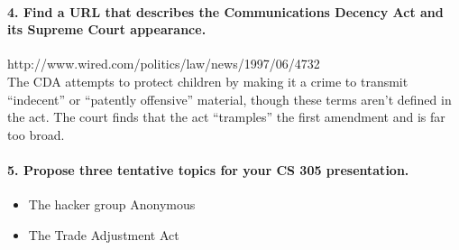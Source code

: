 \documentclass{article}
\begin{document}
\paragraph{4. Find a URL that describes the Communications Decency Act and its Supreme Court appearance.\\}
http://www.wired.com/politics/law/news/1997/06/4732\\
The CDA attempts to protect children by making it a crime to transmit ``indecent'' or ``patently offensive'' material, though these terms aren't defined in the act.
The court finds that the act ``tramples'' the first amendment and is far too broad.

\paragraph{5. Propose three tentative topics for your CS 305 presentation.\\}
\begin{itemize}
\item The hacker group Anonymous
\item The Trade Adjustment Act
\end{itemize}
\end{document}
